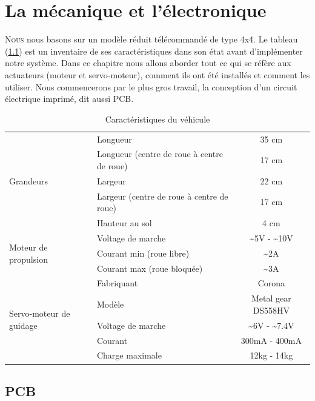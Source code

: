 \documentclass[a4paper,11pt]{report}
\begin{document}
{\chapter{La mécanique et l'électronique}


\lettrine{N}{ous} nous basons sur un modèle réduit
télécommandé de type 4x4. Le tableau (\ref{caracteristiquesDuVehicule}) est un
inventaire de ses caractéristiques dans son état avant d'implémenter notre système. Dans ce chapitre nous
allons aborder tout ce qui se réfère aux actuateurs (moteur et servo-moteur),
comment ils ont été installés et comment les utiliser. Nous commencerons par
le plus gros travail, la conception d'un circuit électrique imprimé, dit aussi PCB. 


\begin{table}[h!]
\begin{center}
  \begin{tabular}{|p{4cm}|p{4cm}|c|}
    \hline
    \multirow{5}{*}{Grandeurs}
    &Longueur & 35 cm \\ \cline{2-3}
    &Longueur (centre de roue \`a centre de roue)& 17 cm \\ \cline{2-3}
    &Largeur & 22 cm \\ \cline{2-3}
    &Largeur (centre de roue \`a centre de roue) & 17 cm \\ \cline{2-3}
    & Hauteur au sol & 4 cm\\ \hline
    \multirow{3}{*}{Moteur de propulsion}
    & Voltage de marche & \~{}5V - \~{}10V  \\ \cline{2-3}
    & Courant min (roue libre) & \~{}2A \\ \cline{2-3}
    & Courant max (roue bloqu\'ee) & \~{}3A \\ \hline
    \multirow{5}{*}{Servo-moteur de guidage}
    & Fabriquant & Corona \\ \cline{2 - 3}
    & Modèle & Metal gear DS558HV\\ \cline{2-3}
    & Voltage de marche & \~{}6V - \~{}7.4V  \\ \cline{2-3}
    & Courant & 300mA - 400mA \\ \cline{2-3}
    & Charge maximale & 12kg - 14kg \\  
 \hline
	\end{tabular}
\end{center}
\caption{Caractéristiques du véhicule\label{caracteristiquesDuVehicule}}
\end{table}

\section{PCB}

}
\end{document}
